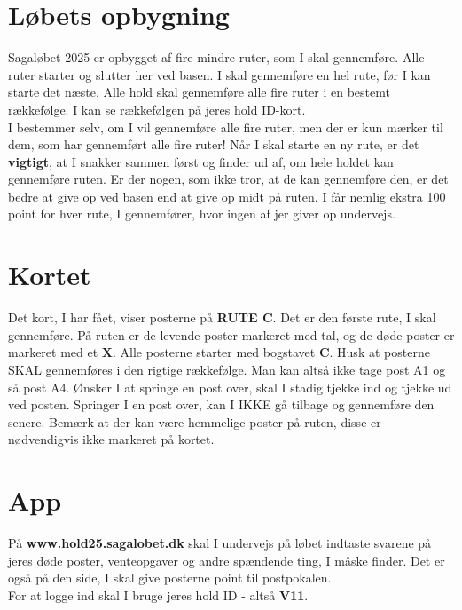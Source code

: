 \section{Løbets opbygning}
Sagaløbet 2025 er opbygget af fire mindre ruter, som I skal gennemføre. Alle ruter starter og slutter her ved basen. I skal gennemføre en hel rute, før I kan starte det næste. Alle hold skal gennemføre alle fire ruter i en bestemt rækkefølge. I kan se rækkefølgen på jeres hold ID-kort.\\\newline
I bestemmer selv, om I vil gennemføre alle fire ruter, men der er kun mærker til dem, som har gennemført alle fire ruter! Når I skal starte en ny rute, er det \textbf{vigtigt}, at I snakker sammen først og finder ud af, om hele holdet kan gennemføre ruten. Er der nogen, som ikke tror, at de kan gennemføre den, er det bedre at give op ved basen end at give op midt på ruten. I får nemlig ekstra 100 point for hver rute, I gennemfører, hvor ingen af jer giver op undervejs.\\
\section{Kortet}
Det kort, I har fået, viser posterne på \textbf{RUTE C}. Det er den første rute, I skal gennemføre. På ruten er de levende poster markeret med tal, og de døde poster er markeret med et \textbf{X}. Alle posterne starter med bogstavet \textbf{C}. Husk at posterne SKAL gennemføres i den rigtige rækkefølge. Man kan altså ikke tage post A1 og så post A4. Ønsker I at springe en post over, skal I stadig tjekke ind og tjekke ud ved posten. Springer I en post over, kan I IKKE gå tilbage og gennemføre den senere. Bemærk at der kan være hemmelige poster på ruten, disse er nødvendigvis ikke markeret på kortet.
\section{App}
På \textbf{www.hold25.sagalobet.dk} skal I undervejs på løbet indtaste svarene på jeres døde poster, venteopgaver og andre spændende ting, I måske finder. Det er også på den side, I skal give posterne point til postpokalen.\\
For at logge ind skal I bruge jeres hold ID - altså \textbf{V11}.
\newpage
